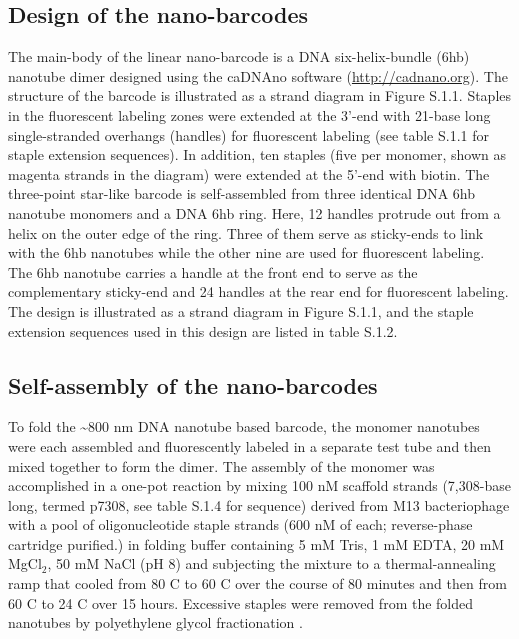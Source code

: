 \subsection{Design of the nano-barcodes}
The main-body of the linear nano-barcode is a DNA six-helix-bundle (6hb) nanotube dimer designed using the caDNAno software (\url{http://cadnano.org}). The structure of the barcode is illustrated as a strand diagram in Figure S.1.1. Staples in the fluorescent labeling zones were extended at the 3'-end with 21-base long single-stranded overhangs (handles) for fluorescent labeling (see table S.1.1 for staple extension sequences). In addition, ten staples (five per monomer, shown as magenta strands in the diagram) were extended at the 5'-end with biotin. The three-point star-like barcode is self-assembled from three identical DNA 6hb nanotube monomers and a DNA 6hb ring. Here, 12 handles protrude out from a helix on the outer edge of the ring. Three of them serve as sticky-ends to link with the 6hb nanotubes while the other nine are used for fluorescent labeling. The 6hb nanotube carries a handle at the front end to serve as the complementary sticky-end and 24 handles at the rear end for fluorescent labeling. The design is illustrated as a strand diagram in Figure S.1.1, and the staple extension sequences used in this design are listed in table S.1.2.

\subsection{Self-assembly of the nano-barcodes}
To fold the \textasciitilde800 nm DNA nanotube based barcode, the monomer nanotubes were each assembled and fluorescently labeled in a separate test tube and then mixed together to form the dimer. The assembly of the monomer was accomplished in a one-pot reaction by mixing 100 nM scaffold strands (7,308-base long, termed p7308, see table S.1.4 for sequence) derived from M13 bacteriophage with a pool of oligonucleotide staple strands (600 nM of each; reverse-phase cartridge purified.) in folding buffer containing 5 mM Tris, 1 mM EDTA, 20 mM MgCl$_2$, 50 mM NaCl (pH 8) and subjecting the mixture to a thermal-annealing ramp that cooled from 80 \textdegree C to 60 \textdegree C over the course of 80 minutes and then from 60 \textdegree C to 24 \textdegree C over 15 hours. Excessive staples were removed from the folded nanotubes by polyethylene glycol fractionation \citep{lis_size_1975}.

